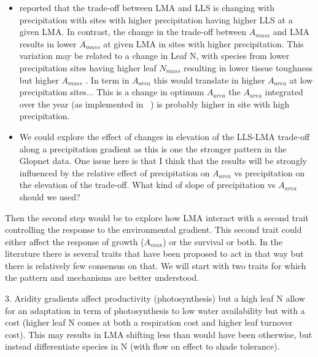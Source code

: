 \documentclass[a4paper,11pt]{article}
\begin{document}
\begin{itemize}
\item \citet{Wright-2005} reported that the trade-off between LMA and LLS is changing with precipitation with sites with higher precipitation having higher LLS at a given LMA. In contrast, the change in the trade-off between $A_{mass}$ and LMA results in lower $A_{mass}$ at given LMA in sites with higher precipitation. This variation may be related to a change in Leaf N, with species from lower precipitation sites having higher leaf $N_{mass}$ resulting in lower tissue toughness but higher $A_{mass}$ \citep{Wright-2002}. In term in $A_{area}$ this would translate in higher $A_{area}$ at low precipitation sites...  This is a change in optimum $A_{area}$ the $A_{area}$ integrated over the year (as implemented in \plant\ ) is probably higher in site with high precipitation.

\item We could explore the effect of changes in elevation of the LLS-LMA trade-off along a precipitation gradient as this is one the stronger pattern in the Glopnet data. One issue here is that I think that the results will be strongly influenced by the relative effect of precipitation on $A_{area}$ vs precipitation on the elevation of the trade-off. What kind of slope of precipitation vs $A_{area}$ should we used?

\end{itemize}

Then the second step would be to explore how LMA interact with a second trait controlling the response to the environmental gradient. This second trait could either affect the response of growth ($A_{max}$) or the survival or both. In the literature there is several traits that have been proposed to act in that way but there is relatively few consensus on that. We will start with two traits for which the pattern and mechanisms are better understood.

3. Aridity gradients affect productivity (photosynthesis) but a
high leaf N allow for an adaptation in term of photosynthesis to low water availability but with a cost (higher leaf N comes at both a respiration cost and higher leaf turnover cost). This may results in LMA shifting less than would have been otherwise, but  instead differentiate species in N (with flow on effect to shade tolerance).
\end{document}
